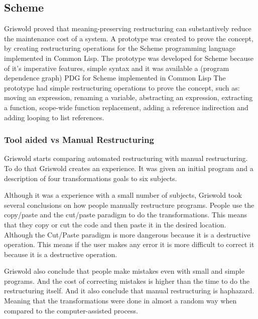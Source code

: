 \subsection{Scheme}

Griswold \cite{griswold1991program} proved that meaning-preserving restructuring can substantively reduce the maintenance cost of a system.
A prototype was created to prove the concept, by creating restructuring operations for the Scheme programming language implemented in Common Lisp.
The prototype was developed for Scheme because of it's imperative features, simple syntax and it was available a (program dependence graph) PDG for Scheme implemented in Common Lisp
The prototype had simple restructuring operations to prove the concept, such as: moving an expression, renaming a variable, abstracting an expression, extracting a function, scope-wide function replacement, adding a reference indirection and adding looping to list references.

\subsubsection{Tool aided vs Manual Restructuring}
Griswold starts comparing automated restructuring with manual restructuring. 
To do that Griswold creates an experience.
It was given an initial program and a description of four transformations goals to six subjects.%

Although it was a experience with a small number of subjects, Griswold took several conclusions on how people manually restructure programs.
People use the copy/paste and the cut/paste paradigm to do the transformations. 
This means that they copy or cut the code and then paste it in the desired location.
Although the Cut/Paste paradigm is more dangerous because it is a destructive operation. 
This means if the user makes any error it is more difficult to correct it because it is a destructive operation.

Griswold also conclude that people make mistakes even with small and simple programs. 
And the cost of correcting mistakes is higher than the time to do the restructuring itself. 
And it also conclude that manual restructuring is haphazard. 
Meaning that the transformations were done in almost a random way when compared to the computer-assisted process.


